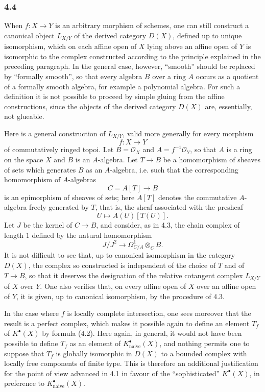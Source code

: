 \subsubsection*{4.4}
When $f:X\to Y$ is an arbitrary morphism of schemes, one can still construct a canonical object $L_{X/Y}$ of the derived category $D(X)$, defined up to unique isomorphism, which on each affine open of $X$ lying above an affine open of $Y$ is isomorphic to the complex constructed according to the principle explained in the preceding paragraph. In the general case, however, ``smooth'' should be replaced by ``formally smooth'', so that every algebra $B$ over a ring $A$ occurs as a quotient of a formally smooth algebra, for example a polynomial algebra. For such a definition it is not possible to proceed by simple gluing from the affine constructions, since the objects of the derived category $D(X)$ are, essentially, not glueable.

Here is a general construction of $L_{X/Y}$, valid more generally for every morphism
\[
f:X\longrightarrow Y
\]
of commutatively ringed topoi. Let $B=\mathcal O_X$ and $A=f^{-1}\mathcal O_Y$, so that $A$ is a ring on the space $X$ and $B$ is an $A$-algebra. Let $T\to B$ be a homomorphism of sheaves of sets which generates $B$ as an $A$-algebra, i.e. such that the corresponding homomorphism of $A$-algebras
\[
C=A[T]\longrightarrow B
\]
is an epimorphism of sheaves of sets; here $A[T]$ denotes the commutative $A$-algebra freely generated by $T$, that is, the sheaf associated with the presheaf
\[
U\longmapsto A(U)[T(U)].
\]
Let $J$ be the kernel of $C\to B$, and consider, as in 4.3, the chain complex of length $1$ defined by the natural homomorphism
\[
J/J^2\longrightarrow \Omega^1_{C/A}\otimes_C B.
\]
It is not difficult to see that, up to canonical isomorphism in the category $D(X)$, the complex so constructed is independent of the choice of $T$ and of $T\to B$, so that it deserves the designation of the relative cotangent complex $L_{X/Y}$ of $X$ over $Y$. One also verifies that, on every affine open of $X$ over an affine open of $Y$, it is given, up to canonical isomorphism, by the procedure of 4.3.

In the case where $f$ is locally complete intersection, one sees moreover that the result is a perfect complex, which makes it possible again to define an element $T_f$ of $K^\bullet(X)$ by formula (4.2). Here again, in general, it would not have been possible to define $T_f$ as an element of $K^\bullet_{\mathrm{naive}}(X)$, and nothing permits one to suppose that $T_f$ is globally isomorphic in $D(X)$ to a bounded complex with locally free components of finite type. This is therefore an additional justification for the point of view advanced in 4.1 in favour of the ``sophisticated'' $K^\bullet(X)$, in preference to $K^\bullet_{\mathrm{naive}}(X)$.

